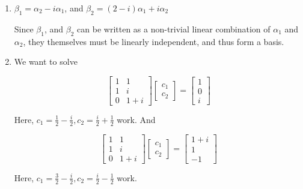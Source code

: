 \documentclass[12pt]{article}
\begin{document}
{\begin{enumerate}[label=(\alph*)]
      \item $\beta_1 = \alpha_2 - i \alpha_1$, and $\beta_2 = (2 - i) \alpha_1 + i \alpha_2$

        Since $\beta_1$, and $\beta_2$ can be written as a non-trivial linear
        combination of $\alpha_1$ and $\alpha_2$, they themselves must be
        linearly independent, and thus form a basis.

      \item We want to solve

        \[
          \begin{bmatrix}
            1 & 1 \\
            1 & i \\
            0 & 1 + i
          \end{bmatrix}
          \begin{bmatrix}
            c_1 \\ c_2
          \end{bmatrix}
          =
          \begin{bmatrix}
            1 \\ 0 \\ i
          \end{bmatrix}
        \]

        Here, $c_1 = \frac{1}{2} - \frac{i}{2}, c_2 = \frac{i}{2} + \frac{1}{2}$
        work. And

        \[
          \begin{bmatrix}
            1 & 1 \\
            1 & i \\
            0 & 1 + i
          \end{bmatrix}
          \begin{bmatrix}
            c_1 \\ c_2
          \end{bmatrix}
          =
          \begin{bmatrix}
            1 + i \\ 1 \\ -1
          \end{bmatrix}
        \]

        Here, $c_1 = \frac{3}{2} - \frac{i}{2}, c_2 = \frac{i}{2} - \frac{1}{2}$
        work.
    \end{enumerate}
  }
\end{document}
